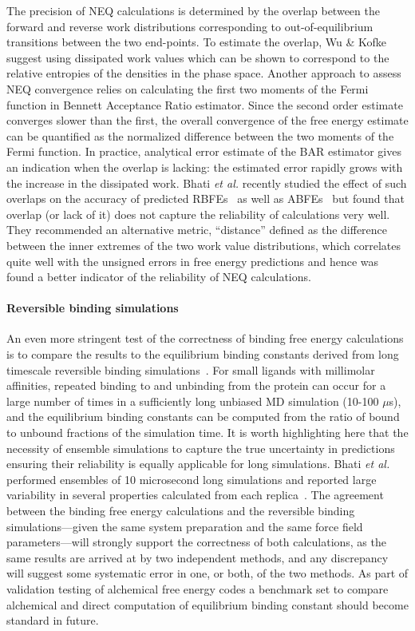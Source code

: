 \documentclass[9pt,bestpractices]{livecoms}
\begin{document}
 The precision of NEQ calculations is determined by the overlap between the forward and reverse work distributions corresponding to out-of-equilibrium transitions between the two end-points. To estimate the overlap, Wu \& Kofke suggest using dissipated work values which can be shown to correspond to the relative entropies of the densities in the phase space. \cite{wu2005phase} Another approach to assess NEQ convergence relies on calculating the first two moments of the Fermi function in Bennett Acceptance Ratio estimator. \cite{hahn2010measuring} Since the second order estimate converges slower than the first, the overall convergence of the free energy estimate can be quantified as the normalized difference between the two moments of the Fermi function. In practice, analytical error estimate of the BAR estimator \cite{shirts2003equilibrium} gives an indication when the overlap is lacking: the estimated error rapidly grows with the increase in the dissipated work. \cite{shirts2005comparison} Bhati \textit{et al.} recently studied the effect of such overlaps on the accuracy of predicted RBFEs~\cite{wan2023eqvsneq} as well as ABFEs~\cite{bhati2025} but found that overlap (or lack of it) does not capture the reliability of calculations very well. They recommended an alternative metric, ``distance'' defined as the difference between the inner extremes of the two work value distributions, which correlates quite well with the unsigned errors in free energy predictions and hence was found a better indicator of the reliability of NEQ calculations. 

\paragraph{Reversible binding simulations}
An even more stringent test of the correctness of binding free energy calculations is to compare the results to the equilibrium binding constants derived from long timescale reversible binding simulations~\cite{pan2017quantitative}. For small ligands with millimolar affinities, repeated binding to and unbinding from the protein can occur for a large number of times in a sufficiently long unbiased MD simulation (10-100 $\mu$s), and the equilibrium binding constants can be computed from the ratio of bound to unbound fractions of the simulation time. 
It is worth highlighting here that the necessity of ensemble simulations to capture the true uncertainty in predictions ensuring their reliability is equally applicable for long simulations. Bhati \textit{et al.} performed ensembles of 10 microsecond long simulations and reported large variability in several properties calculated from each replica~\cite{bhati2023}.
The agreement between the binding free energy calculations and the reversible binding simulations---given the same system preparation and the same force field parameters---will strongly support the correctness of both calculations, as the same results are arrived at by two independent methods, and any discrepancy will suggest some systematic error in one, or both, of the two methods. As part of validation testing of alchemical free energy codes a benchmark set to compare alchemical and direct computation of equilibrium binding constant should become standard in future.
\end{document}
